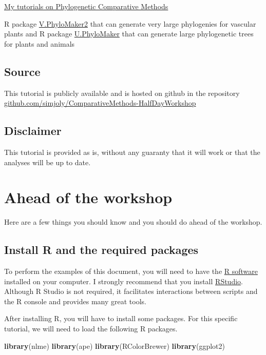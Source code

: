 \documentclass[
]{book}
\newenvironment{Shaded}{\begin{snugshade}}{\end{snugshade}}
\newcommand{\FunctionTok}[1]{\textcolor[rgb]{0.13,0.29,0.53}{\textbf{#1}}}
\newcommand{\NormalTok}[1]{#1}
\begin{document}
\href{http://github.com/simjoly/CourseComparativeMethods/}{My tutorials on Phylogenetic Comparative Methods}

R package \href{https://doi.org/10.1016/j.pld.2022.05.005}{V.PhyloMaker2} that can generate very large phylogenies for vascular plants and R package \href{https://doi.org/10.1016/j.pld.2022.12.007}{U.PhyloMaker} that can generate large phylogenetic trees for plants and animals

\section{Source}\label{source}

This tutorial is publicly available and is hosted on github in the repository \href{https://github.com/simjoly/ComparativeMethods-HalfDayWorkshop}{github.com/simjoly/ComparativeMethods-HalfDayWorkshop}

\section{Disclaimer}\label{disclaimer}

This tutorial is provided as is, without any guaranty that it will work or that the analyses will be up to date.

\chapter{Ahead of the workshop}\label{before}

Here are a few things you should know and you should do ahead of the workshop.

\section{Install R and the required packages}\label{install-r-and-the-required-packages}

To perform the examples of this document, you will need to have the \href{https://www.r-project.org/}{R software} installed on your computer. I strongly recommend that you install \href{https://rstudio.com/}{RStudio}. Although R Studio is not required, it facilitates interactions between scripts and the R console and provides many great tools.

After installing R, you will have to install some packages. For this specific tutorial, we will need to load the following R packages.

\begin{Shaded}
\begin{Highlighting}[]
\FunctionTok{library}\NormalTok{(nlme)}
\FunctionTok{library}\NormalTok{(ape)}
\FunctionTok{library}\NormalTok{(RColorBrewer)}
\FunctionTok{library}\NormalTok{(ggplot2)}
\end{Highlighting}
\end{Shaded}
\end{document}
